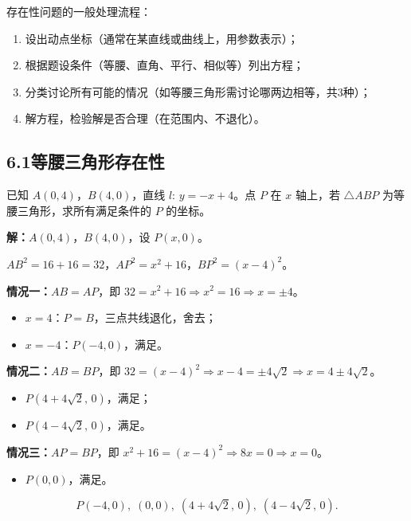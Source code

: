 \documentclass[12pt, a4paper]{ctexart}
\begin{document}
\begin{knowledgebox}[存在性问题的分类讨论思想]
存在性问题的一般处理流程：
\begin{enumerate}[label=(\arabic*)]
  \item 设出动点坐标（通常在某直线或曲线上，用参数表示）；
  \item 根据题设条件（等腰、直角、平行、相似等）列出方程；
  \item 分类讨论所有可能的情况（如等腰三角形需讨论哪两边相等，共3种）；
  \item 解方程，检验解是否合理（在范围内、不退化）。
\end{enumerate}
\end{knowledgebox}

\subsection*{6.1\quad 等腰三角形存在性}

\begin{examplebox}[【例15】等腰三角形存在性]
已知 $A(0,4)$，$B(4,0)$，直线 $l:\,y=-x+4$。点 $P$ 在 $x$ 轴上，若 $\triangle ABP$ 为等腰三角形，求所有满足条件的 $P$ 的坐标。

\textbf{解：}$A(0,4)$，$B(4,0)$，设 $P(x,0)$。

$AB^2=16+16=32$，$AP^2=x^2+16$，$BP^2=(x-4)^2$。

\textbf{情况一：}$AB=AP$，即 $32=x^2+16\Rightarrow x^2=16\Rightarrow x=\pm 4$。
\begin{itemize}
  \item $x=4$：$P=B$，三点共线退化，舍去；
  \item $x=-4$：$P(-4,0)$，满足。
\end{itemize}

\textbf{情况二：}$AB=BP$，即 $32=(x-4)^2\Rightarrow x-4=\pm 4\sqrt{2}\Rightarrow x=4\pm 4\sqrt{2}$。
\begin{itemize}
  \item $P(4+4\sqrt{2},\,0)$，满足；
  \item $P(4-4\sqrt{2},\,0)$，满足。
\end{itemize}

\textbf{情况三：}$AP=BP$，即 $x^2+16=(x-4)^2\Rightarrow 8x=0\Rightarrow x=0$。
\begin{itemize}
  \item $P(0,0)$，满足。
\end{itemize}

\[\boxed{P(-4,0),\;(0,0),\;(4+4\sqrt{2},\,0),\;(4-4\sqrt{2},\,0).}\]
\end{examplebox}
\end{document}
